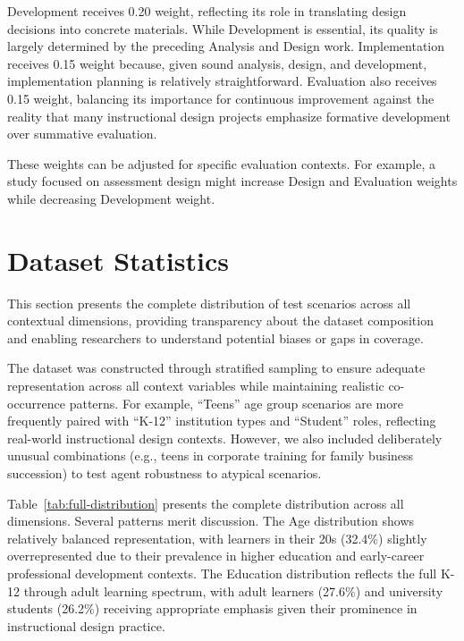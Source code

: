 Development receives 0.20 weight, reflecting its role in translating design decisions into concrete materials. While Development is essential, its quality is largely determined by the preceding Analysis and Design work. Implementation receives 0.15 weight because, given sound analysis, design, and development, implementation planning is relatively straightforward. Evaluation also receives 0.15 weight, balancing its importance for continuous improvement against the reality that many instructional design projects emphasize formative development over summative evaluation.

These weights can be adjusted for specific evaluation contexts. For example, a study focused on assessment design might increase Design and Evaluation weights while decreasing Development weight.

\section{Dataset Statistics}
\label{app:dataset}

This section presents the complete distribution of test scenarios across all contextual dimensions, providing transparency about the dataset composition and enabling researchers to understand potential biases or gaps in coverage.

The dataset was constructed through stratified sampling to ensure adequate representation across all context variables while maintaining realistic co-occurrence patterns. For example, ``Teens'' age group scenarios are more frequently paired with ``K-12'' institution types and ``Student'' roles, reflecting real-world instructional design contexts. However, we also included deliberately unusual combinations (e.g., teens in corporate training for family business succession) to test agent robustness to atypical scenarios.

Table~\ref{tab:full-distribution} presents the complete distribution across all dimensions. Several patterns merit discussion. The Age distribution shows relatively balanced representation, with learners in their 20s (32.4\%) slightly overrepresented due to their prevalence in higher education and early-career professional development contexts. The Education distribution reflects the full K-12 through adult learning spectrum, with adult learners (27.6\%) and university students (26.2\%) receiving appropriate emphasis given their prominence in instructional design practice.

